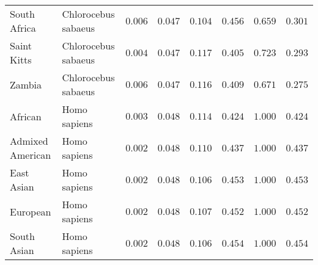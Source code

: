 \documentclass{article}
\begin{document}
\begin{center}
\begin{longtable*}{|l|l|r|r|r|r|r|r|}
            South Africa & Chlorocebus sabaeus &               $ 0.006$ &             $ 0.047$ &              $ 0.104$ &                                     $ 0.456$ &                       $ 0.659$ &                 $ 0.301$ \\
            Saint Kitts & Chlorocebus sabaeus &               $ 0.004$ &             $ 0.047$ &              $ 0.117$ &                                     $ 0.405$ &                       $ 0.723$ &                 $ 0.293$ \\
            Zambia & Chlorocebus sabaeus &               $ 0.006$ &             $ 0.047$ &              $ 0.116$ &                                     $ 0.409$ &                       $ 0.671$ &                 $ 0.275$ \\
            African &        Homo sapiens &               $ 0.003$ &             $ 0.048$ &              $ 0.114$ &                                     $ 0.424$ &                       $ 1.000$ &                 $ 0.424$ \\
            Admixed American &        Homo sapiens &               $ 0.002$ &             $ 0.048$ &              $ 0.110$ &                                     $ 0.437$ &                       $ 1.000$ &                 $ 0.437$ \\
            East Asian &        Homo sapiens &               $ 0.002$ &             $ 0.048$ &              $ 0.106$ &                                     $ 0.453$ &                       $ 1.000$ &                 $ 0.453$ \\
            European &        Homo sapiens &               $ 0.002$ &             $ 0.048$ &              $ 0.107$ &                                     $ 0.452$ &                       $ 1.000$ &                 $ 0.452$ \\
            South Asian &        Homo sapiens &               $ 0.002$ &             $ 0.048$ &              $ 0.106$ &                                     $ 0.454$ &                       $ 1.000$ &                 $ 0.454$ \\
        \end{longtable*}
    \end{center}
\end{document}
